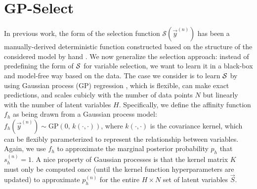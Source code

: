 \section{GP-Select}
%
In previous work, the form of the selection function $\mathcal{S}(\vec{y}^{(n)})$ has been
a manually-derived deterministic function constructed based on the structure of the considered model by hand 
 \citep[see e.g.][]{SheltonEtAl2011, SheltonEtAl2012, DaiLucke2012a, DaiLucke2012b,
BornscheinEtAl2013, SheikhEtAl2014}.
%
We now generalize the selection approach:  %
instead of predefining the form of $\mathcal{S}$ for variable selection, we want
to learn it in a black-box and model-free way based on the data.
%
The case we consider is to learn $\mathcal{S}$ by using Gaussian process (GP) regression
\citep[e.g.][]{RasmussenGPbook}, which is flexible, can make exact predictions,
and scales cubicly with the number of data points $N$ but linearly with the number of latent variables $H$.  
%
%
%
%
Specifically, we define the affinity function $f_h$ as being drawn from a Gaussian process model: 
$f_h(\vec{y}^{(n)}) \sim \text{GP}\left(0, \, k(\cdot,\cdot) \right)$, where $k(\cdot, \cdot)$ is the covariance kernel, 
which can be flexibly parameterized to represent the relationship between variables.
Again, we use $f_h$ to approximate the marginal posterior probability $p_h$ that $s_h^{(n)}=1$.
%
A nice property of Gaussian processes is that the kernel matrix $K$ must only be computed once (until the kernel function hyperparameters are updated) 
to approximate $p_h^{(n)}$ for the entire $H\times N$ set of latent variables $\vec{S}$.

